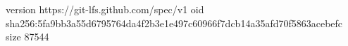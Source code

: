version https://git-lfs.github.com/spec/v1
oid sha256:5fa9bb3a55d6795764da4f2b3e1e497c60966f7dcb14a35afd70f5863acebefc
size 87544

